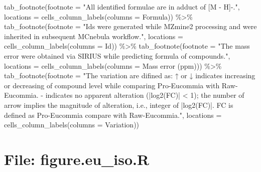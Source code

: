 \documentclass[
]{article}
\newenvironment{Shaded}{\begin{snugshade}}{\end{snugshade}}
\newcommand{\AttributeTok}[1]{\textcolor[rgb]{0.77,0.63,0.00}{#1}}
\newcommand{\FunctionTok}[1]{\textcolor[rgb]{0.00,0.00,0.00}{#1}}
\newcommand{\NormalTok}[1]{#1}
\newcommand{\SpecialCharTok}[1]{\textcolor[rgb]{0.00,0.00,0.00}{#1}}
\newcommand{\StringTok}[1]{\textcolor[rgb]{0.31,0.60,0.02}{#1}}
\begin{document}
\begin{Shaded}
\begin{Highlighting}[]
\FunctionTok{tab\_footnote}\NormalTok{(}\AttributeTok{footnote =} \StringTok{"All identified formulae are in adduct of \textquotesingle{}[M {-} H]{-}\textquotesingle{}."}\NormalTok{,}
  \AttributeTok{locations =} \FunctionTok{cells\_column\_labels}\NormalTok{(}\AttributeTok{columns =} \StringTok{\textasciigrave{}}\AttributeTok{Formula}\StringTok{\textasciigrave{}}\NormalTok{)) }\SpecialCharTok{\%\textgreater{}\%} 
\FunctionTok{tab\_footnote}\NormalTok{(}\AttributeTok{footnote =} \StringTok{"Ids were generated while MZmine2 processing and were inherited in subsequent MCnebula workflow."}\NormalTok{,}
  \AttributeTok{locations =} \FunctionTok{cells\_column\_labels}\NormalTok{(}\AttributeTok{columns =} \StringTok{\textasciigrave{}}\AttributeTok{Id}\StringTok{\textasciigrave{}}\NormalTok{)) }\SpecialCharTok{\%\textgreater{}\%} 
\FunctionTok{tab\_footnote}\NormalTok{(}\AttributeTok{footnote =} \StringTok{"The mass error were obtained via SIRIUS while predicting formula of compounds."}\NormalTok{,}
  \AttributeTok{locations =} \FunctionTok{cells\_column\_labels}\NormalTok{(}\AttributeTok{columns =} \StringTok{\textasciigrave{}}\AttributeTok{Mass error (ppm)}\StringTok{\textasciigrave{}}\NormalTok{)) }\SpecialCharTok{\%\textgreater{}\%} 
\FunctionTok{tab\_footnote}\NormalTok{(}\AttributeTok{footnote =} \StringTok{"The variation are difined as: ↑ or ↓ indicates increasing or decreasing of compound level while comparing Pro{-}Eucommia with Raw{-}Eucommia.  {-} indicates no apparent alteration (|log2(FC)| \textless{} 1); the number of arrow implies the magnitude of alteration, i.e., integer of |log2(FC)|. FC is defined as Pro{-}Eucommia compare with Raw{-}Eucommia."}\NormalTok{,}
  \AttributeTok{locations =} \FunctionTok{cells\_column\_labels}\NormalTok{(}\AttributeTok{columns =} \StringTok{\textasciigrave{}}\AttributeTok{Variation}\StringTok{\textasciigrave{}}\NormalTok{))}
\end{Highlighting}
\end{Shaded}

\hypertarget{file-figure.eu_iso.r}{%
\section{File: figure.eu\_iso.R}\label{file-figure.eu_iso.r}}
\end{document}
